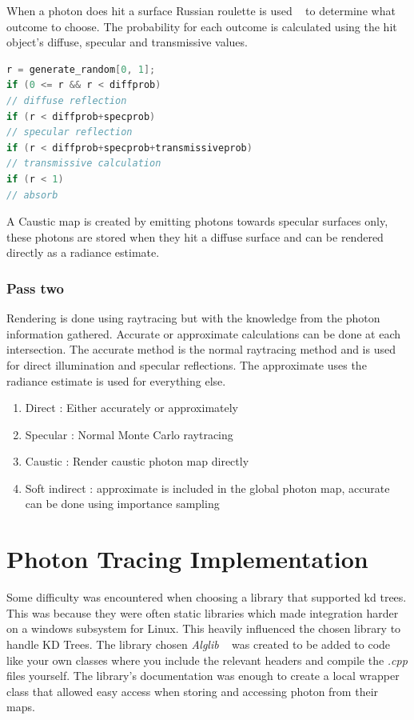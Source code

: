 \documentclass{article}
\begin{document}
When a photon does hit a surface Russian roulette is used ~\cite{ref:photonMappingGUIDE} to determine what outcome to choose. The probability for each outcome is calculated using the hit object's diffuse, specular and transmissive values. 
\begin{lstlisting}[language=c++]
r = generate_random[0, 1];
if (0 <= r && r < diffprob) 
// diffuse reflection
if (r < diffprob+specprob) 
// specular reflection
if (r < diffprob+specprob+transmissiveprob) 
// transmissive calculation
if (r < 1)
// absorb
\end{lstlisting}

A Caustic map is created by emitting photons towards specular surfaces only, these photons are stored when they hit a diffuse surface and can be rendered directly as a radiance estimate.

\subsubsection{Pass two}
Rendering is done using raytracing but with the knowledge from the photon information gathered. Accurate or approximate calculations can be done at each intersection. The accurate method is the normal raytracing method and is used for direct illumination and specular reflections. The approximate uses the radiance estimate is used for everything else. 

\begin{enumerate}
\item Direct : Either accurately or approximately 
\item Specular : Normal Monte Carlo raytracing
\item Caustic : Render caustic photon map directly
\item Soft indirect : approximate is included in the global photon map, accurate can be done using importance sampling
\end{enumerate}

\section{Photon Tracing Implementation}
Some difficulty was encountered when choosing a library that supported kd trees. This was because they were often static libraries which made integration harder on a windows subsystem for Linux. This heavily influenced the chosen library to handle KD Trees. The library chosen \textit{Alglib} ~\cite{ref:alglib} was created to be added to code like your own classes where you include the relevant headers and compile the \textit{.cpp} files yourself. The library's documentation was enough to create a local wrapper class that allowed easy access when storing and accessing photon from their maps.
\end{document}

